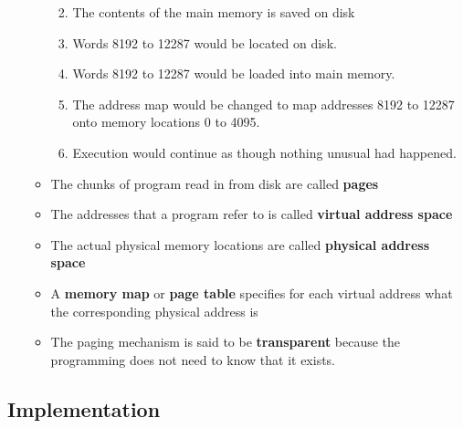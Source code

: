 \documentclass[11pt]{article}
\providecommand{\tightlist}{%
      \setlength{\itemsep}{0pt}\setlength{\parskip}{0pt}}
\begin{document}
\begin{itemize}
\begin{itemize}
    \begin{enumerate}
    \def\labelenumi{\arabic{enumi}.}
    \tightlist
    \item
      The contents of the main memory is saved on disk
    \item
      Words 8192 to 12287 would be located on disk.
    \item
      Words 8192 to 12287 would be loaded into main memory.
    \item
      The address map would be changed to map addresses 8192 to 12287
      onto memory locations 0 to 4095.
    \item
      Execution would continue as though nothing unusual had happened.
    \end{enumerate}
  \item
    The chunks of program read in from disk are called \textbf{pages}
  \item
    The addresses that a program refer to is called \textbf{virtual
    address space}
  \item
    The actual physical memory locations are called \textbf{physical
    address space}
  \item
    A \textbf{memory map} or \textbf{page table} specifies for each
    virtual address what the corresponding physical address is
  \item
    The paging mechanism is said to be \textbf{transparent} because the
    programming does not need to know that it exists.
  \end{itemize}
\end{itemize}

    \subsection{Implementation}\label{implementation}
\end{document}

